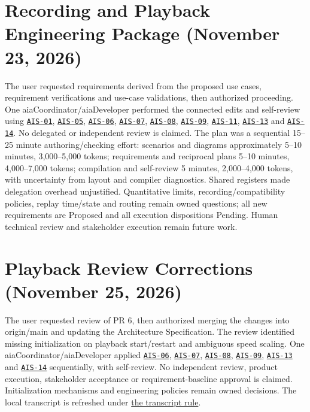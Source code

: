 \section{Recording and Playback Engineering Package (November 23, 2026)}
\label{Section:DiagnosticPackagePrompt}
The user requested requirements derived from the proposed use cases, requirement verifications and use-case validations, then authorized proceeding. One aiaCoordinator/aiaDeveloper performed the connected edits and self-review using \hyperref[Skill:AIS-01]{\texttt{AIS-01}}, \hyperref[Skill:AIS-05]{\texttt{AIS-05}}, \hyperref[Skill:AIS-06]{\texttt{AIS-06}}, \hyperref[Skill:AIS-07]{\texttt{AIS-07}}, \hyperref[Skill:AIS-08]{\texttt{AIS-08}}, \hyperref[Skill:AIS-09]{\texttt{AIS-09}}, \hyperref[Skill:AIS-11]{\texttt{AIS-11}}, \hyperref[Skill:AIS-13]{\texttt{AIS-13}} and \hyperref[Skill:AIS-14]{\texttt{AIS-14}}. No delegated or independent review is claimed. The plan was a sequential 15--25 minute authoring/checking effort: scenarios and diagrams approximately 5--10 minutes, 3,000--5,000 tokens; requirements and reciprocal plans 5--10 minutes, 4,000--7,000 tokens; compilation and self-review 5 minutes, 2,000--4,000 tokens, with uncertainty from layout and compiler diagnostics. Shared registers made delegation overhead unjustified. Quantitative limits, recording/compatibility policies, replay time/state and routing remain owned questions; all new requirements are Proposed and all execution dispositions Pending. Human technical review and stakeholder execution remain future work.

\section{Playback Review Corrections (November 25, 2026)}
\label{Section:PlaybackReviewCorrectionsPrompt}
The user requested review of PR 6, then authorized merging the changes into origin/main and updating the Architecture Specification. The review identified missing initialization on playback start/restart and ambiguous speed scaling. One aiaCoordinator/aiaDeveloper applied \hyperref[Skill:AIS-06]{\texttt{AIS-06}}, \hyperref[Skill:AIS-07]{\texttt{AIS-07}}, \hyperref[Skill:AIS-08]{\texttt{AIS-08}}, \hyperref[Skill:AIS-09]{\texttt{AIS-09}}, \hyperref[Skill:AIS-13]{\texttt{AIS-13}} and \hyperref[Skill:AIS-14]{\texttt{AIS-14}} sequentially, with self-review. No independent review, product execution, stakeholder acceptance or requirement-baseline approval is claimed. Initialization mechanisms and engineering policies remain owned decisions. The local transcript is refreshed under \hyperref[Rule:AIChatLogging]{the transcript rule}.

